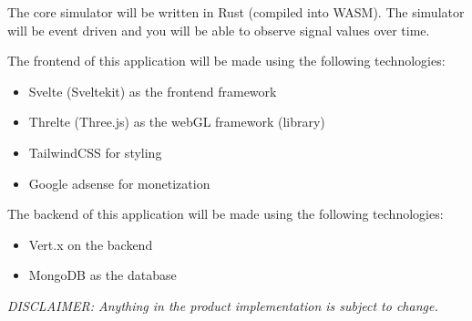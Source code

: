 \documentclass[12pt]{article}
\begin{document}
The core simulator will be written in Rust (compiled into WASM).
The simulator will be event driven and you will be able to observe signal values over time.


The frontend of this application will be made using the following technologies:
\begin{itemize}
    \item Svelte (Sveltekit) as the frontend framework
    \item Threlte (Three.js) as the webGL framework (library)
    \item TailwindCSS for styling
    \item Google adsense for monetization
\end{itemize}
The backend of this application will be made using the following technologies:
\begin{itemize}
    \item Vert.x on the backend
    \item MongoDB as the database
\end{itemize}

\textit{DISCLAIMER: Anything in the product implementation is subject to change.}
\end{document}
